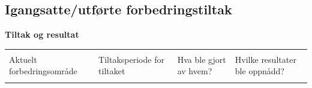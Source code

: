 \documentclass{article}
\begin{document}
    \subsection{Igangsatte/utførte forbedringstiltak}
    
    
    \newpage
    
    \textbf{Tiltak og resultat} \\
    \begin{centering}
        \begin{tabularx}{\linewidth}{| X | X | X | X |}
            \hline
            \color{red}{Kolonne A: } & \color{red}{Kolonne B: } & \color{red}{Kolonne C: } & \color{red}{Kolonne D: } \\
            Aktuelt forbedringsområde & Tiltaksperiode for tiltaket & Hva ble gjort av hvem? & Hvilke resultater ble oppnådd? \\ \hline
            
            
            &
            
            &
            
            &
            
            \\ \hline
                 
        \end{tabularx}
    \end{centering}
    
\end{document}
